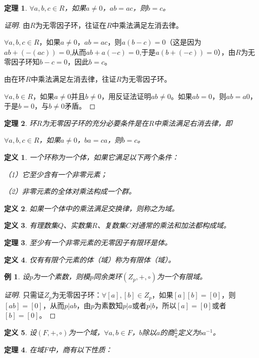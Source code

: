 \documentclass{article}
\newtheorem{Def}{定义}
\newtheorem{Thm}{定理}
\newtheorem*{Example}{例}
\begin{document}
\begin{CJK*}{UTF8}{gbsn}
\begin{Thm}
    $\forall a,b,c\in R$，如果$a\neq 0$，$ab=ac$，则$b=c$。
  \end{Thm}
  \begin{proof}[证明]
    由$R$为无零因子环，往证在$R$中乘法满足左消去律。
  
    $\forall a,b,c\in R$，如果$a\neq 0$，$ab=ac$，则$a(b-c)=0$（这是因为$ab+(-(ac))=0$,从而$ab+a(-c)=0$,于是$a(b+(-c))=0$），由$R$为无零因子环知$b-c=0$，因此$b=c$。
  
    由在环$R$中乘法满足左消去律，往证$R$为无零因子环。
  
  
    $\forall a,b\in R$，如果$a\neq 0$并且$b\neq 0$，用反证法证明$ab\neq 0$。如果$ab=0$，则$ab=a0$，于是$b=0$，与$b\neq 0$矛盾。
  
  \end{proof}
  \begin{Thm}
    环$R$为无零因子环的充分必要条件是在$R$中乘法满足右消去律，即
  
  
    $\forall a,b,c\in R$，如果$a\neq 0$，$ba=ca$，则$b=c$。
  
  \end{Thm}
  \begin{Def}
    一个环称为一个体，如果它满足以下两个条件：
  
    （1）它至少含有一个非零元素；
  
    （2）非零元素的全体对乘法构成一个群。
  \end{Def}
  
  \begin{Def}
    如果一个体中的乘法满足交换律，则称之为域。
  \end{Def}
  \begin{Def}
    有理数集$Q$、实数集$R$、复数集$C$对通常的乘法和加法都构成域。
  \end{Def}
  \begin{Thm}
    至少有一个非零元素的无零因子有限环是体。
  \end{Thm}
  \begin{Def}
    仅有有限个元素的体（域）称为有限体（域）。
  \end{Def}
  \begin{Example}
    设$p$为一个素数，则模$p$同余类环$(Z_p,+,\circ)$为一个有限域。
  \end{Example}
  \begin{proof}[证明]
    只需证$Z_p$为无零因子环：$\forall [a],[b]\in Z_p$，如果$[a][b]=[0]$，则$[ab]=[0]$，从而$p|ab$，由$p$为素数知$p|a$或者$p|b$，所以$[a]=[0]$或者$[b]=[0]$。
  \end{proof}
  \begin{Def}
    设$(F,+,\circ)$为一个域，$\forall a,b\in F$，$b$除以$a$的商$\frac{b}{a}$定义为$ba^{-1}$。
  \end{Def}
  \begin{Thm}
    在域$F$中，商有以下性质：
  

\end{Thm}
\end{CJK*}
\end{document}
